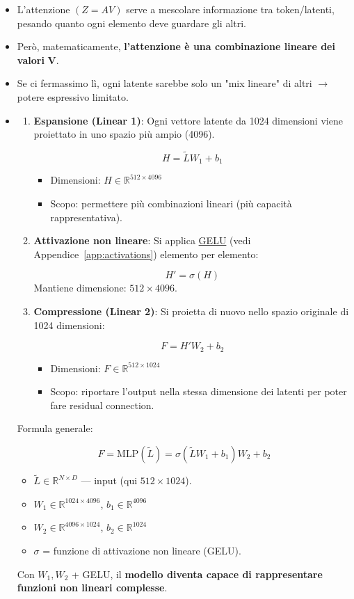 \documentclass[
  11pt,
]{article}
\begin{document}
\begin{itemize}
\item
  L'attenzione \((Z = AV)\) serve a mescolare
  informazione tra token/latenti, pesando quanto ogni elemento deve
  guardare gli altri.
\item
  Però, matematicamente, \textbf{l'attenzione è una
  combinazione lineare dei valori} \(\mathbf{V}\).
\item
  Se ci fermassimo lì, ogni latente sarebbe solo un "mix lineare" di
  altri \(\rightarrow\) potere espressivo limitato.
\item

\begin{enumerate}
\item \textbf{Espansione (Linear 1)}: Ogni vettore latente da 1024 dimensioni viene proiettato in uno spazio più ampio (4096).

\[
H = \tilde{L} W_1 + b_1
\]
\begin{itemize}
\item Dimensioni: $H \in \mathbb{R}^{512 \times 4096}$
\item Scopo: permettere più combinazioni lineari (più capacità rappresentativa).
\end{itemize}
\item \textbf{Attivazione non lineare}: Si applica \hyperref[app:activations]{GELU} (vedi Appendice~\ref{app:activations}) elemento per elemento:

\[
H' = \sigma(H)
\]
Mantiene dimensione: $512 \times 4096$.
\item \textbf{Compressione (Linear 2)}: Si proietta di nuovo nello spazio originale di 1024 dimensioni:

\[
F = H' W_2 + b_2
\]
\begin{itemize}
\item Dimensioni: $F \in \mathbb{R}^{512 \times 1024}$
\item Scopo: riportare l'output nella stessa dimensione dei latenti per poter fare residual connection.
\end{itemize}
\end{enumerate}

Formula generale:

\[
F = \text{MLP}(\tilde{L}) = \sigma(\tilde{L} W_1 + b_1) W_2 + b_2
\]
\begin{itemize}
\item $\tilde{L} \in \mathbb{R}^{N \times D}$ --- input (qui $512 \times 1024$).
\item $W_1 \in \mathbb{R}^{1024 \times 4096}$, $b_1 \in \mathbb{R}^{4096}$
\item $W_2 \in \mathbb{R}^{4096 \times 1024}$, $b_2 \in \mathbb{R}^{1024}$
\item $\sigma$ = funzione di attivazione non lineare (GELU).
\end{itemize}

Con
  \(W_{1},W_{2}\) + GELU, il \textbf{modello diventa capace di
  rappresentare funzioni non lineari complesse}.
\end{itemize}
\end{document}
